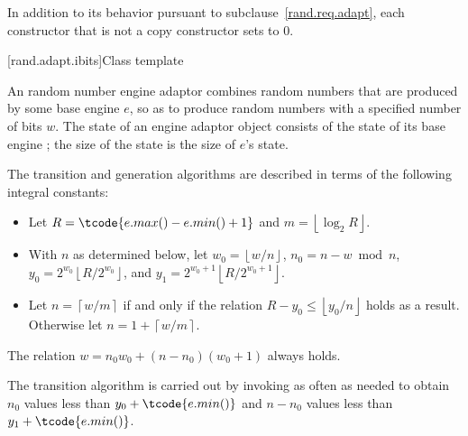\pnum
In addition to its behavior
pursuant to subclause~\ref{rand.req.adapt},
each constructor%
that is not a copy constructor
sets  to $0$.


[rand.adapt.ibits]{Class template }%
%

\pnum
An 
random number engine adaptor
combines random numbers
that are produced by some base engine $e$,
so as to produce random numbers
with a specified number of bits $w$.
The state%
%
of an 
engine adaptor object 
consists of
 the state  of its base engine ;
the size of the state is
 the size of $e$'s state.

\pnum
The transition and generation algorithms
are described in terms
of the following integral constants:%
\begin{itemize}
 \item
   Let
     $R = \tcode{e.max() - e.min() + 1}$
   and
     $m = \left\lfloor \log_2 R \right\rfloor$.
 \item
   With $n$ as determined below,
   let
     $w_0 = \left\lfloor w / n \right\rfloor$,
     $n_0 = n - w \bmod n$,
     $y_0 = 2^{w_0} \left\lfloor R / 2^{w_0} \right\rfloor$,
   and
     $y_1 = 2^{w_0 + 1} \left\lfloor R / 2^{w_0 + 1} \right\rfloor$.
 \item
   Let
     $n = \left\lceil w / m \right\rceil$
   if and only if the relation
     $R - y_0 \leq \left\lfloor y_0 / n \right\rfloor$
   holds as a result.
   Otherwise let
     $n = 1 + \left\lceil w / m \right\rceil$.
\end{itemize}
\begin{note}
 The relation
 $w = n_0 w_0 + (n - n_0)(w_0 + 1)$
 always holds.
\end{note}

\pnum
The transition algorithm%
%
is carried out by invoking 
as often as needed to obtain $n_0$
values less than $y_0 + \tcode{e.min()}$
and $n - n_0$ values less than $y_1 + \tcode{e.min()}$.

